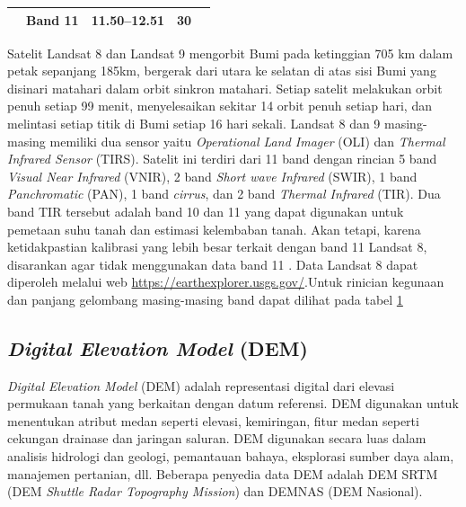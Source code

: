 \begin{table}[h]
{\begin{tabular}{lcccl}
		& Band 11 & 11.50–12.51                                                                   & 30           &                                                                                                                                                                 \\ \hline
	\end{tabular}%
}
\label{tab:Landsat}
\end{table}

\hspace{25pt}Satelit Landsat 8 dan Landsat 9 mengorbit Bumi pada ketinggian 705 km dalam petak sepanjang 185km, bergerak dari utara ke selatan di atas sisi Bumi yang disinari matahari dalam orbit sinkron matahari. Setiap satelit melakukan orbit penuh setiap 99 menit, menyelesaikan sekitar 14 orbit penuh setiap hari, dan melintasi setiap titik di Bumi setiap 16 hari sekali. Landsat 8 dan 9 masing-masing memiliki dua sensor yaitu \textit{Operational Land Imager} (OLI) dan \textit{Thermal Infrared Sensor }(TIRS). Satelit ini terdiri dari 11 band dengan rincian 5 band \textit{Visual Near Infrared} (VNIR), 2 band \textit{Short wave Infrared} (SWIR), 1 band \textit{Panchromatic} (PAN), 1 band \textit{cirrus}, dan 2 band \textit{Thermal Infrared} (TIR). Dua band TIR tersebut adalah band 10 dan 11 yang dapat digunakan untuk pemetaan suhu tanah dan estimasi kelembaban tanah. Akan tetapi, karena ketidakpastian kalibrasi yang lebih besar terkait dengan band 11 Landsat 8, disarankan agar tidak menggunakan data band 11 \citep{USGS2022}. Data Landsat 8 dapat diperoleh melalui web \href{https://earthexplorer.usgs.gov/}{https://earthexplorer.usgs.gov/}.Untuk rinician kegunaan dan panjang gelombang masing-masing band dapat dilihat pada tabel \ref{tab:Landsat}

\subsection{\textit{Digital Elevation Model} (DEM)}
\hspace{25pt}\textit{Digital Elevation Model} (DEM) adalah representasi digital dari elevasi permukaan tanah yang berkaitan dengan datum referensi. DEM digunakan untuk menentukan atribut medan seperti elevasi, kemiringan, fitur medan seperti cekungan drainase dan jaringan saluran. DEM digunakan secara luas dalam analisis hidrologi dan geologi, pemantauan bahaya, eksplorasi sumber daya alam, manajemen pertanian, dll.  Beberapa penyedia data DEM adalah DEM SRTM (DEM \textit{Shuttle Radar Topography Mission}) dan DEMNAS (DEM Nasional). 

